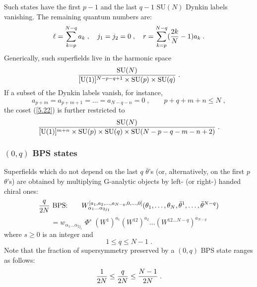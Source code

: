 \documentclass[a4paper,12pt]{article}
\begin{document}
Such states have the first $p-1$ and the last $q-1$ $\mbox{SU}(N)$ Dynkin 
labels vanishing. The remaining quantum numbers are: 
\begin{equation}\label{5.21}
  \ell = \sum_{k=p}^{N-q}a_k\;, \quad j_1=j_2=0\;, \quad r = 
\sum_{k=p}^{N-q}({2k\over N}-1)a_k\;. 
\end{equation}
Generically, such superfields live in the harmonic space
\begin{equation}\label{5.22}
{\mbox{SU}(N)\over [\mbox{U}(1)]^{N-p-q+1}\times 
\mbox{SU}(p)\times \mbox{SU}(q)}\;.   
\end{equation}
If a subset of the Dynkin labels vanish, for instance, 
$$
a_{p+m}=a_{p+m+1}= \ldots =a_{N-q-n}= 0\;, \qquad p+q+m+n\leq N\;, 
$$
the coset (\ref{5.22}) is further restricted to 
\begin{equation}\label{5.23}
{\mbox{SU}(N)\over [\mbox{U}(1)]^{m+n}\times \mbox{SU}(p)\times 
\mbox{SU}(q)\times \mbox{SU}(N-p-q-m-n+2)}\;.   
\end{equation} 

\subsubsection{$(0,q)$ BPS states} 

Superfields which do not depend on the last  $q$ $\bar\theta$'s 
(or, alternatively, on the first $p$ $\theta$'s) are obtained 
by multiplying G-analytic objects by left- (or right-) handed 
chiral ones: 
$$
{q\over 2N}\mbox{ BPS:}\qquad 
W^{[a_1,a_{2},\ldots,a_{N-q},0,\ldots,0]}_{\alpha_1\ldots\alpha_{2j_1}} 
(\theta_{1},\ldots,\theta_{N}, 
\bar\theta^1,\ldots,\bar\theta^{N-q}) 
$$ 
\begin{equation}\label{5.24}
=w_{\alpha_1\ldots\alpha_{2j_1}}\;\Phi^s\; 
(W^{1})^{a_1}(W^{12})^{a_{2}}\ldots (W^{12\ldots N-q})^{a_{N-q}}   
\end{equation}
where $s\geq0$ is an integer and 
\begin{equation}\label{5.25}
  1\leq q \leq N-1\;.
\end{equation}
Note that the fraction of supersymmetry preserved by a $(0,q)$ BPS 
state ranges as follows: 
\begin{equation}\label{5.25'}
{1\over 2N} \leq {q\over 2N} \leq {N-1\over 2N}\;.
\end{equation}
\end{document}
